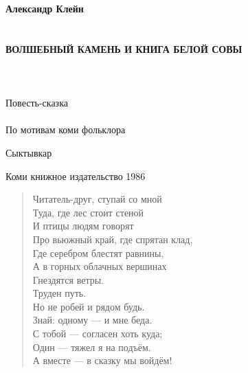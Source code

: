 \documentclass[12pt, a4paper, openany]{book}
\begin{document}
	
	\begin{titlepage}
		
		\begin{center}
			
			\vspace*{\fill}
			
			
			{\large\bf Александр Клейн\\}
			\ \\
			\ \\
			{\Huge\bf ВОЛШЕБНЫЙ КАМЕНЬ И КНИГА БЕЛОЙ СОВЫ\\}
			\ \\
			\ \\
			\ \\
			Повесть-сказка
			\ \\
			\ \\
			По мотивам коми фольклора
			\vspace*{\fill}    
			
			\vfill
			
			Сыктывкар
			
			Коми книжное издательство 1986
		\end{center}
		
	\end{titlepage}
	
	\thispagestyle{empty} %
	
	\newpage
	
	\begin{flushleft}
		\begin{verse}
			\qquad \qquad Читатель-друг, ступай со мной\\
			\qquad \qquad Туда, где лес стоит стеной\\
			\qquad \qquad И птицы людям говорят\\
			\qquad \qquad Про вьюжный край, где спрятан клад,\\
			\qquad \qquad Где серебром блестят равнины,\\
			\qquad \qquad А в горных облачных вершинах\\
			\qquad \qquad Гнездятся ветры.\\
			\qquad \qquad\qquad\qquad\qquad\qquad Труден путь.\\
			\qquad \qquad Но не робей и рядом будь.\\
			\qquad \qquad Знай: одному — и мне беда.\\
			\qquad \qquad С тобой — согласен хоть куда;\\
			\qquad \qquad Один — тяжел я на подъём.\\
			\qquad \qquad А вместе — в сказку мы войдём!\\
			\qquad \qquad 
		\end{verse}
	\end{flushleft}
\end{document}

